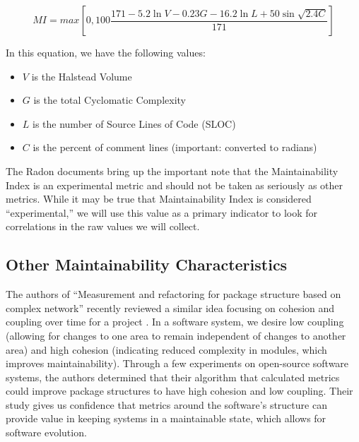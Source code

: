 $$
MI = max[0, 100\frac{171 - 5.2 \ln{V} - 0.23G - 16.2 \ln{L} + 50 \sin{\sqrt{2.4C}}}{171}]
$$

\noindent
In this equation, we have the following values:
\begin{singlespace}
  \begin{itemize}
    \item $V$ is the Halstead Volume
    \item $G$ is the total Cyclomatic Complexity
    \item $L$ is the number of Source Lines of Code (SLOC)
    \item $C$ is the percent of comment lines (important: converted to radians)
  \end{itemize}    
\end{singlespace}

The Radon documents bring up the important note that the Maintainability Index is an experimental metric and should not be taken as seriously as other metrics. While it may be true that Maintainability Index is considered ``experimental,'' we will use this value as a primary indicator to look for correlations in the raw values we will collect.


\subsection{Other Maintainability Characteristics} \label{subOtherCharacteristics}

The authors of ``Measurement and refactoring for package structure based on complex network'' recently reviewed a similar idea focusing on cohesion and coupling over time for a project \cite{zhou:2020}. In a software system, we desire low coupling (allowing for changes to one area to remain independent of changes to another area) and high cohesion (indicating reduced complexity in modules, which improves maintainability). Through a few experiments on open-source software systems, the authors determined that their algorithm that calculated metrics could improve package structures to have high cohesion and low coupling. Their study gives us confidence that metrics around the software's structure can provide value in keeping systems in a maintainable state, which allows for software evolution.


